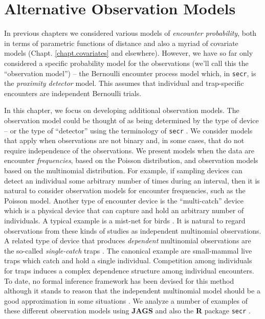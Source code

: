 \chapter{Alternative Observation Models}
\label{chapt.poisson-mn}

\vspace{.3in}



In previous chapters we considered various models of {\it encounter
  probability}, both in terms of parametric functions of distance and
also a myriad of covariate models (Chapt. \ref{chapt.covariates} and
elsewhere).  However, we have so far only considered a specific
probability model for the observations (we'll call this the
``observation model'') -- the Bernoulli encounter process model which,
in \mbox{\tt secr}, is the {\it proximity detector} model. This
assumes that individual and trap-specific encounters are independent
Bernoulli trials.

In this chapter, we focus on developing additional observation models.
The observation model could be thought of as being determined by the
type of device -- or the type of ``detector'' using the terminology of
\mbox{\tt secr} \citep{efford:2011}.  We consider models that apply
when observations are not binary and, in some cases, that do not
require independence of the observations.  We present models when the
data are encounter {\it frequencies}, based on the Poisson
distribution, and observation models based on the multinomial
distribution. For example, if sampling devices can detect an
individual some arbitrary number of times during an interval, then it
is natural to consider observation models for encounter frequencies,
such as the Poisson model. Another type of encounter device is the
``multi-catch'' device \citep{efford_etal:2009euring} which is a
physical device that can capture and hold an arbitrary number of
individuals. A typical example is a mist-net for birds
\citep{borchers_efford:2008}.  It is natural to regard observations
from these kinds of studies as independent multinomial observations.
A related type of device that produces {\it dependent} multinomial
observations are the so-called {\it single-catch} traps
\citep{efford:2004, efford_etal:2009euring}. The canonical example are
small-mammal live traps which catch and hold a single
individual. Competition among individuals for traps induces a complex
dependence structure among individual encounters. To date, no formal
inference framework has been devised for this method although it
stands to reason that the independent multinomial model should be a
good approximation in some situations \citep{efford_etal:2009euring}.
We analyze a number of examples of these different observation models
using {\bf JAGS} and also the {\bf R} package \mbox{\tt secr}
\citep{efford:2011}.





